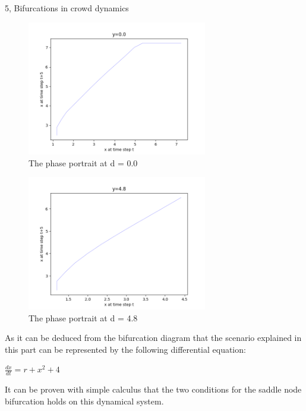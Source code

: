 \documentclass[10pt,a4paper]{article}
\begin{document}
\begin{task}{5, Bifurcations in crowd dynamics}
\begin{figure}[H]
    \centering
    \includegraphics[width=0.7\textwidth]{../plots/task5/0_phase_portrait_y_0_0_second_part.png}
    \caption{The phase portrait at d = 0.0}
    \label{fig:part2_bifurcation}
\end{figure}

\begin{figure}[H]
    \centering
    \includegraphics[width=0.7\textwidth]{../plots/task5/0_phase_portrait_y_4_8_second_part.png}
    \caption{The phase portrait at d = 4.8}
    \label{fig:part2_bifurcation}
\end{figure}
As it can be deduced from the bifurcation diagram that the scenario explained in this part can be represented by the following differential equation:
\begin{center}
	$\frac{dx}{dt} = r + x^{2} + 4$
\end{center}
It can be proven with simple calculus that the two conditions for the saddle node bifurcation holds on this dynamical system.
\end{task}
\newpage


\nocite{*}
\end{document}
